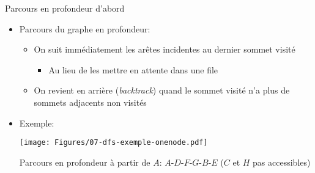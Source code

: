 \begin{frame}{Parcours en profondeur d'abord}

\begin{itemize}
\item Parcours du graphe en profondeur:
\begin{itemize}
\item On suit immédiatement les arêtes incidentes au dernier sommet visité
\begin{itemize}
\item Au lieu de les mettre en attente dans une file
\end{itemize}
\item On revient en arrière ({\it backtrack}) quand le sommet visité
  n'a plus de sommets adjacents non visités
\end{itemize}

\bigskip

\item Exemple:
\centerline{\texttt{[image: Figures/07-dfs-exemple-onenode.pdf]}}

\bigskip

Parcours en profondeur à partir de $A$: $A$-$D$-$F$-$G$-$B$-$E$ ($C$ et $H$ pas accessibles)
\end{itemize}


\end{frame}





